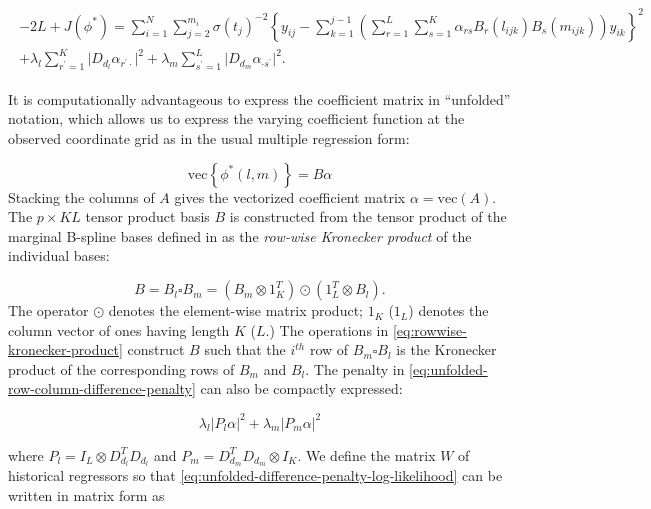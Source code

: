 \documentclass[12pt]{article}
\newcommand{\ms}{\scriptscriptstyle}
\theoremstyle{definition}
\begin{document}
\begin{align} 
\begin{split}\label{eq:unfolded-difference-penalty-log-likelihood}
-2L + J\left(\phi^*\right) = \sum_{i=1}^N \sum_{j=2}^{m_i} \sigma\left({t_j}\right)^{-2} \left\{y_{ij} - \sum_{k=1}^{j-1} \left( \sum_{r=1}^L \sum_{s=1}^K \alpha_{rs} B_r\left(l_{ijk}\right)B_s\left(m_{ijk}\right)\right)y_{ik} \right\}^2 \\ 
+ \lambda_l \sum_{r^\prime=1}^K \vert D_{d_{\ms l}} \alpha_{r^\prime \cdot} \vert^2 + \lambda_m \sum_{s^\prime=1}^L \vert D_{d_{\ms m}} \alpha_{\cdot s^\prime} \vert^2.
\end{split}
\end{align}

It is computationally advantageous to express the coefficient matrix in ``unfolded'' notation, which allows us to express the varying coefficient function at the observed coordinate grid as in the usual multiple regression form:

\begin{equation*}
\mbox{vec}\left\{\phi^*\left(l,m\right)\right\} = B \alpha
\end{equation*}
\noindent
Stacking the columns of $A$ gives the vectorized coefficient matrix $\alpha = \mbox{vec}\left( A \right)$. The $p \times KL$ tensor product basis $B$ is constructed from the tensor product of the marginal B-spline bases defined in \citet{eilers2006fast} as the \textit{row-wise Kronecker product} of the individual bases:

\begin{equation} \label{eq:rowwise-kronecker-product}
B = B_l \square B_m = \left( B_m \otimes 1^T_{K} \right) \odot \left(1^T_{L} \otimes  B_l  \right).
\end{equation}
\noindent
The operator $\odot$ denotes the element-wise matrix product; $1_K$ ($1_L$) denotes the column vector of ones having length $K$ ($L$.) The operations in \ref{eq:rowwise-kronecker-product} construct $B$ such that the $i^{th}$ row of $B_m\square B_l$ is the Kronecker product of the corresponding rows of $B_m$ and $B_l$. The penalty in \ref{eq:unfolded-row-column-difference-penalty} can also be compactly expressed:

\begin{equation} \label{eq:tensor-product-penalty}
\lambda_l \vert P_l \alpha \vert^2 + \lambda_m \vert P_m \alpha \vert^2
\end{equation}

where $P_l = I_L \otimes D_{d_{\ms l}}^T D_{d_{\ms l}} $ and $P_m =  D_{d_{\ms m}}^T D_{d_{\ms m}} \otimes I_K$. We define the matrix $W$ of historical regressors so that \ref{eq:unfolded-difference-penalty-log-likelihood} can be written in matrix form as
\end{document}
